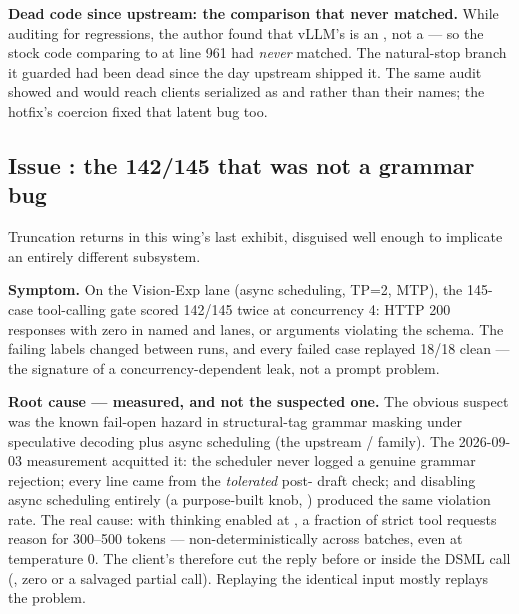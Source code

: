 \begin{hbnote}
\textbf{Dead code since upstream: the comparison that never matched.} While
auditing for regressions, the author found that vLLM's 
is an , not a  --- so the stock code comparing
 to  at 
line 961 had \emph{never} matched. The 
natural-stop branch it guarded had been dead since the day upstream shipped
it. The same audit showed  and 
would reach clients serialized as  and  rather than
their names; the hotfix's  coercion fixed that latent bug
too.
\end{hbnote}

\subsection{Issue : the 142/145 that was not a grammar bug}

Truncation returns in this wing's last exhibit, disguised well enough to
implicate an entirely different subsystem.

\textbf{Symptom.} On the Vision-Exp lane (async scheduling, TP=2, MTP), the
145-case tool-calling gate scored 142/145 twice at concurrency 4: HTTP 200
responses with zero  in named and  lanes, or
arguments violating the  schema. The failing labels changed
between runs, and every failed case replayed 18/18 clean --- the signature of a
concurrency-dependent leak, not a prompt problem.

\textbf{Root cause --- measured, and not the suspected one.} The obvious
suspect was the known fail-open hazard in structural-tag grammar masking under
speculative decoding plus async scheduling (the upstream /%
 family). The 2026-09-03 measurement acquitted it: the
scheduler never logged a genuine grammar rejection; every
 line came from the \emph{tolerated} post-%
 draft check; and disabling async scheduling entirely
(a purpose-built knob, )
produced the same violation rate. The real cause: with thinking enabled at
, a fraction of strict tool requests reason for
300--500 tokens --- non-deterministically across batches, even at temperature
0. The client's  therefore cut the reply before or inside
the DSML call (, zero or a salvaged partial call).
Replaying the identical input mostly replays the problem.


